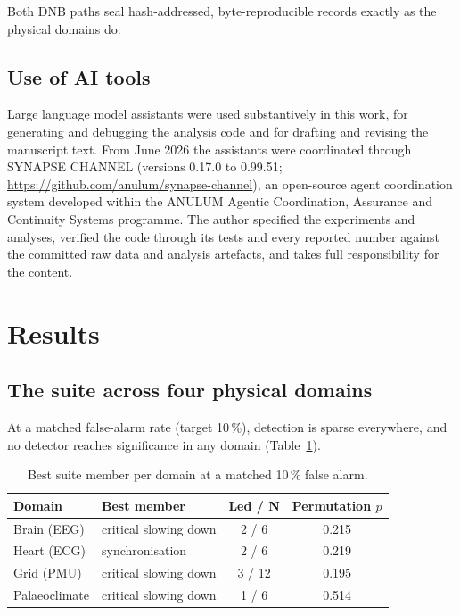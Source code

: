 \documentclass[aip,cha,preprint,amsmath,amssymb]{revtex4-2}
\begin{document}
Both DNB paths seal hash-addressed, byte-reproducible records exactly
as the physical domains do.

\subsection{Use of AI tools}\label{sec:aiuse}

Large language model assistants were used substantively in this work,
for generating and debugging the analysis code and for drafting and
revising the manuscript text. From June 2026 the assistants were
coordinated through SYNAPSE CHANNEL (versions 0.17.0 to 0.99.51;
\url{https://github.com/anulum/synapse-channel}), an open-source agent
coordination system developed within the ANULUM Agentic Coordination,
Assurance and Continuity Systems programme. The author specified the
experiments and analyses, verified the code through its tests and every
reported number against the committed raw data and analysis artefacts,
and takes full responsibility for the content.

\section{Results}\label{sec:results}

\subsection{The suite across four physical domains}\label{sec:fourdomain}

At a matched false-alarm rate (target 10\,\%), detection is sparse
everywhere, and no detector reaches significance in any domain
(Table~\ref{tab:fourdomain}).

\begin{table}[h!]
\centering
\begin{tabular}{llcc}
\toprule
Domain & Best member & Led / N & Permutation $p$ \\
\midrule
Brain (EEG) & critical slowing down & 2 / 6 & 0.215 \\
Heart (ECG) & synchronisation & 2 / 6 & 0.219 \\
Grid (PMU) & critical slowing down & 3 / 12 & 0.195 \\
Palaeoclimate & critical slowing down & 1 / 6 & 0.514 \\
\bottomrule
\end{tabular}
\caption{Best suite member per domain at a matched 10\,\% false alarm.}
\label{tab:fourdomain}
\end{table}
\end{document}
